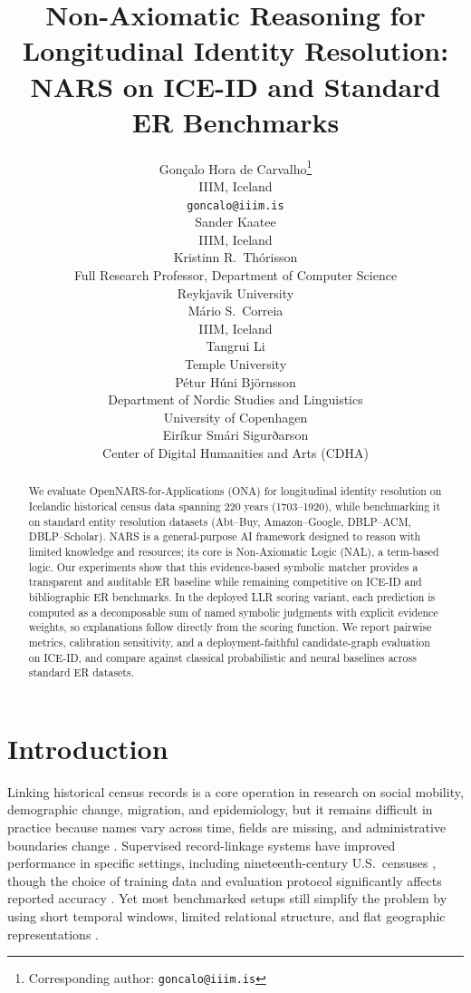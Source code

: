 \documentclass{article}
\title{Non-Axiomatic Reasoning for Longitudinal Identity Resolution: NARS on ICE-ID and Standard ER Benchmarks}
\author{%
   Gonçalo Hora de Carvalho\thanks{Corresponding author: \texttt{goncalo@iiim.is}} \\
  IIIM, Iceland \\
  \texttt{goncalo@iiim.is} \\
  \And
  Sander Kaatee \\
  IIIM, Iceland \\
  \AND
  Kristinn R.~Thórisson \\
  Full Research Professor, Department of Computer Science\\
  Reykjavik University\\
  \And
    M\'ario S.~Correia \\
  IIIM, Iceland \\
  \AND
  Tangrui Li \\
  Temple University\\
  \And
  Pétur Húni Björnsson \\
  Department of Nordic Studies and Linguistics\\
  University of Copenhagen\\
  \And
  Eiríkur Smári Sigurðarson \\
  Center of Digital Humanities and Arts (CDHA)\\
  \And
}
\begin{document}
\maketitle

\begin{abstract}
We evaluate OpenNARS-for-Applications (ONA) for longitudinal identity resolution on Icelandic historical census data spanning 220 years (1703--1920), while benchmarking it on standard entity resolution datasets (Abt--Buy, Amazon--Google, DBLP--ACM, DBLP--Scholar). NARS is a general-purpose AI framework designed to reason with limited knowledge and resources; its core is Non-Axiomatic Logic (NAL), a term-based logic. Our experiments show that this evidence-based symbolic matcher provides a transparent and auditable ER baseline while remaining competitive on ICE-ID and bibliographic ER benchmarks. In the deployed LLR scoring variant, each prediction is computed as a decomposable sum of named symbolic judgments with explicit evidence weights, so explanations follow directly from the scoring function. We report pairwise metrics, calibration sensitivity, and a deployment-faithful candidate-graph evaluation on ICE-ID, and compare against classical probabilistic and neural baselines across standard ER datasets.
\end{abstract}


\section{Introduction}

Linking historical census records is a core operation in research on social mobility, demographic change, migration, and epidemiology, but it remains difficult in practice because names vary across time, fields are missing, and administrative boundaries change \cite{ruggles2018historical, bailey2020}. Supervised record-linkage systems have improved performance in specific settings, including nineteenth-century U.S.\ censuses \cite{feigenbaum2016}, though the choice of training data and evaluation protocol significantly affects reported accuracy \cite{feigenbaum2025training}. Yet most benchmarked setups still simplify the problem by using short temporal windows, limited relational structure, and flat geographic representations \cite{papadakis2023}.
\end{document}
